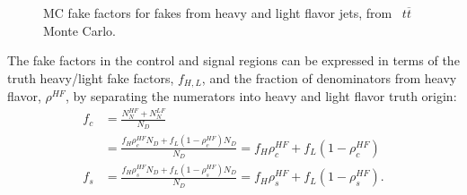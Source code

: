   \begin{figure}[h]
    \centering
    \caption{MC fake factors for fakes from heavy and light flavor jets, from \mcatnlo\  $t\overline{t}$ Monte Carlo.}
    \label{fig:el-ff-ttbar}
  \end{figure}
  

  The fake factors in the control and signal regions can be expressed in terms of the truth heavy/light fake factors, $f_{H,L}$, and the fraction of denominators from heavy flavor, $\rho^{HF}$, by separating the numerators into heavy and light flavor truth origin:
  \begin{align}
      f_c &= \frac{N_N^{HF} + N_N^{LF}}{N_D}\\
          &= \frac{f_H \rho_c^{HF} N_D + f_L (1-\rho_c^{HF}) N_D}{N_D} = f_H \rho_c^{HF} + f_L (1-\rho_c^{HF})\\
      f_s &= \frac{f_H \rho_s^{HF} N_D + f_L (1-\rho_s^{HF}) N_D}{N_D} = f_H \rho_s^{HF} + f_L (1-\rho_s^{HF}).
  \end{align}

